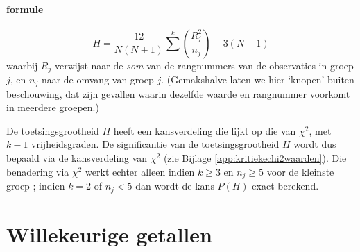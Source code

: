 \documentclass[
]{book}
\begin{document}
\hypertarget{formule}{%
\subsubsection{formule}\label{formule}}

\begin{equation}
  \label{eq:kruskall-wallis-H}
    H = \frac{12}{N(N+1)} \sum^{k} (\frac{R^2_j}{n_j}) - 3(N+1)
\end{equation}
waarbij \(R_j\) verwijst naar de \emph{som} van de rangnummers van de
observaties in groep \(j\), en \(n_j\) naar de omvang van groep \(j\).
(Gemakshalve laten we hier `knopen' buiten beschouwing, dat zijn
gevallen waarin dezelfde waarde en rangnummer voorkomt in meerdere
groepen.)

De toetsingsgrootheid \(H\) heeft een kansverdeling die lijkt op die van
\(\chi^2\), met \(k-1\) vrijheidsgraden. De significantie van de
toetsingsgrootheid \(H\) wordt dus bepaald via de kansverdeling van
\(\chi^2\) (zie Bijlage \ref{app:kritiekechi2waarden}).
Die benadering via \(\chi^2\) werkt echter alleen indien \(k\ge3\)
en \(n_j\ge5\) voor de kleinste groep \citep{Ferg89}; indien \(k=2\) of \(n_j<5\)
dan wordt de kans \(P(H)\) exact berekend.

\hypertarget{appendix-bijlagen}{%
\appendix}


\hypertarget{app:randomgetallen}{%
\chapter{Willekeurige getallen}\label{app:randomgetallen}}
\end{document}
